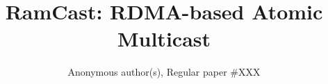 \documentclass[sigconf]{acmart}
\begin{document}
\title{RamCast: RDMA-based Atomic Multicast}
\date{}

\author{
Anonymous author(s), Regular paper \#XXX
}



\maketitle









\clearpage




\end{document}
